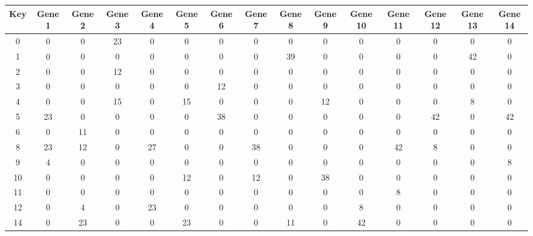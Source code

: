\begin{tabular}{|c|c|c|c|c|c|c|c|c|c|c|c|c|c|c|}
\hline
Key & Gene 1 & Gene 2 & Gene 3 & Gene 4 & Gene 5 & Gene 6 & Gene 7 & Gene 8 & Gene 9 & Gene 10 & Gene 11 & Gene 12 & Gene 13 & Gene 14 \\
\hline
0 & 0 & 0 & 23 & 0 & 0 & 0 & 0 & 0 & 0 & 0 & 0 & 0 & 0 & 0 \\
1 & 0 & 0 & 0 & 0 & 0 & 0 & 0 & 39 & 0 & 0 & 0 & 0 & 42 & 0 \\
2 & 0 & 0 & 12 & 0 & 0 & 0 & 0 & 0 & 0 & 0 & 0 & 0 & 0 & 0 \\
3 & 0 & 0 & 0 & 0 & 0 & 12 & 0 & 0 & 0 & 0 & 0 & 0 & 0 & 0 \\
4 & 0 & 0 & 15 & 0 & 15 & 0 & 0 & 0 & 12 & 0 & 0 & 0 & 8 & 0 \\
5 & 23 & 0 & 0 & 0 & 0 & 38 & 0 & 0 & 0 & 0 & 0 & 42 & 0 & 42 \\
6 & 0 & 11 & 0 & 0 & 0 & 0 & 0 & 0 & 0 & 0 & 0 & 0 & 0 & 0 \\
8 & 23 & 12 & 0 & 27 & 0 & 0 & 38 & 0 & 0 & 0 & 42 & 8 & 0 & 0 \\
9 & 4 & 0 & 0 & 0 & 0 & 0 & 0 & 0 & 0 & 0 & 0 & 0 & 0 & 8 \\
10 & 0 & 0 & 0 & 0 & 12 & 0 & 12 & 0 & 38 & 0 & 0 & 0 & 0 & 0 \\
11 & 0 & 0 & 0 & 0 & 0 & 0 & 0 & 0 & 0 & 0 & 8 & 0 & 0 & 0 \\
12 & 0 & 4 & 0 & 23 & 0 & 0 & 0 & 0 & 0 & 8 & 0 & 0 & 0 & 0 \\
14 & 0 & 23 & 0 & 0 & 23 & 0 & 0 & 11 & 0 & 42 & 0 & 0 & 0 & 0 \\
\hline
\end{tabular}